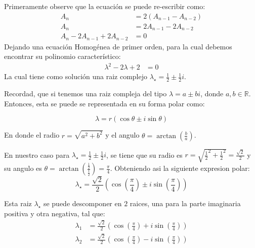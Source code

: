 \begin{solution}
Primeramente observe que la ecuación se puede re-escribir como:
\begin{align*}
    A_n &= 2(A_{n-1} - A_{n-2})\\
    A_n &= 2A_{n-1} - 2A_{n-2}\\
    A_n - 2A_{n-1} + 2A_{n-2} &= 0
\end{align*}
Dejando una ecuación Homogénea de primer orden, para la cual debemos encontrar su polinomio característico:
\begin{align*}
    \lambda^2 -2\lambda +2 &= 0
\end{align*}
La cual tiene como solución una raiz complejo $\lambda_{\star} = \frac{1}{2} \pm \frac{1}{2}i$. 

Recordad, que si tenemos una raiz compleja del tipo $\lambda = a \pm bi$, donde $a,b \in \mathbb{R}$. Entonces, esta se puede se representada en su forma polar como:

$$\lambda = r(\cos{\theta} \pm i\sin{\theta})$$

En donde el radio $r=\sqrt{a^2 + b^2}$ y el angulo $\theta = \arctan\left(\frac{b}{a}\right)$.

En nuestro caso para $\lambda_{\star} = \frac{1}{2} \pm \frac{1}{2}i$, se tiene que su radio es $r = \sqrt{\frac{1}{2}^2 + \frac{1}{2}^2} =\frac{\sqrt{2}}{2}$ y su angulo es $\theta = \arctan\left(\frac{\frac{1}{2}}{\frac{1}{2}}\right)=\frac{\pi}{4}$. Obteniendo asi la siguiente expresion polar:
$$\lambda_{\star} = \frac{\sqrt{2}}{2}(\cos{\left( \frac{\pi}{4} \right)} \pm i\sin{\left( \frac{\pi}{4} \right)})$$

Esta raiz $\lambda_{\star}$ se puede descomponer en $2$ raices, una para la parte imaginaria positiva y otra negativa, tal que:
\begin{align*}
    \lambda_1 &= \frac{\sqrt{2}}{2}(\cos{\left( \frac{\pi}{4} \right)}+i\sin{\left(\frac{\pi}{4} \right)}) \\
    \lambda_2 &= \frac{\sqrt{2}}{2}(\cos{\left( \frac{\pi}{4} \right)}-i\sin{\left(\frac{\pi}{4} \right)}) 
\end{align*}


\end{solution}
